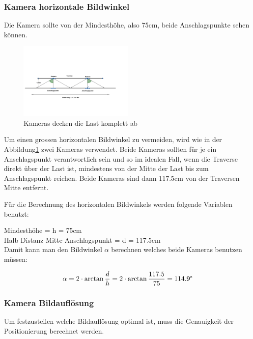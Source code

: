 \subsubsection{Kamera horizontale Bildwinkel}

Die Kamera sollte von der Mindesthöhe, also 75cm, beide Anschlagspunkte sehen können.

\begin{figure}[H]
    \centering
    \includegraphics[width=0.5\textwidth]{graphics/KameraFOV.png}\hfill%
    \caption{Kameras decken die Last komplett ab}
    \label{fig:FOV}
\end{figure}

Um einen grossen horizontalen Bildwinkel zu vermeiden, wird wie in der Abbildung\ref{fig:FOV} zwei Kameras verwendet. 
Beide Kameras sollten für je ein Anschlagspunkt verantwortlich sein und so im idealen Fall, wenn die Traverse direkt über der Last ist, mindestens von der Mitte der Last bis zum Anschlagspunkt reichen.
Beide Kameras sind dann 117.5cm von der Traversen Mitte entfernt.

Für die Berechnung des horizontalen Bildwinkels werden folgende Variablen benutzt:

Mindesthöhe = h = 75cm\\
Halb-Distanz Mitte-Anschlagspunkt = d = 117.5cm\\

Damit kann man den Bildwinkel \(\alpha\) berechnen welches beide Kameras benutzen müssen:

\begin{equation}
    \alpha = 2 \cdot \arctan\frac{d}{h} = 2 \cdot \arctan\frac{117.5}{75} = 114.9\degree
    \label{eq:FOV}
\end{equation}


\subsubsection{Kamera Bildauflösung}
Um festzustellen welche Bildauflösung optimal ist, muss die Genauigkeit der Positionierung berechnet werden.

